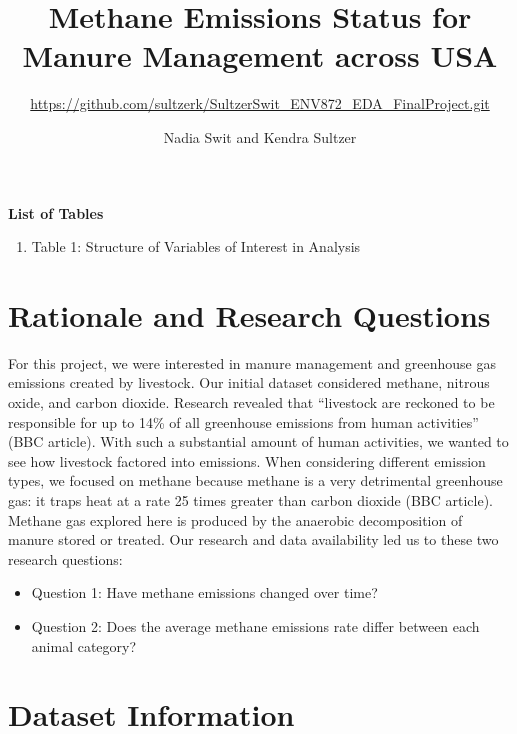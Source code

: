 \documentclass[
  12pt,
]{article}
\title{Methane Emissions Status for Manure Management across USA}
\subtitle{\url{https://github.com/sultzerk/SultzerSwit_ENV872_EDA_FinalProject.git}}
\author{Nadia Swit and Kendra Sultzer}
\date{}
\providecommand{\tightlist}{%
  \setlength{\itemsep}{0pt}\setlength{\parskip}{0pt}}
\begin{document}
\maketitle

\newpage
\tableofcontents 
\newpage

\textbf{List of Tables}

\begin{enumerate}
\def\labelenumi{\arabic{enumi}.}
\tightlist
\item
  Table 1: Structure of Variables of Interest in Analysis \newpage

  \listoffigures 
  \newpage
\end{enumerate}

\hypertarget{rationale-and-research-questions}{%
\section{Rationale and Research
Questions}\label{rationale-and-research-questions}}

For this project, we were interested in manure management and greenhouse
gas emissions created by livestock. Our initial dataset considered
methane, nitrous oxide, and carbon dioxide. Research revealed that
``livestock are reckoned to be responsible for up to 14\% of all
greenhouse emissions from human activities'' (BBC article). With such a
substantial amount of human activities, we wanted to see how livestock
factored into emissions. When considering different emission types, we
focused on methane because methane is a very detrimental greenhouse gas:
it traps heat at a rate 25 times greater than carbon dioxide (BBC
article). Methane gas explored here is produced by the anaerobic
decomposition of manure stored or treated. Our research and data
availability led us to these two research questions:

\begin{itemize}
\item
  Question 1: Have methane emissions changed over time?
\item
  Question 2: Does the average methane emissions rate differ between
  each animal category?
\end{itemize}

\newpage

\hypertarget{dataset-information}{%
\section{Dataset Information}\label{dataset-information}}
\end{document}
